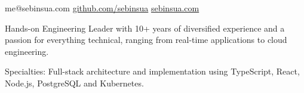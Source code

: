 \documentclass[10pt,a4paper]{article}
\begin{document}
\sloppy  %


\nobreakvspace{0.3em}  %

\noindent
me@sebinsua.com\sbull
\href{http://github.com/sebinsua}{github.com/sebinsua}\sbull
\href{http://sebinsua.com}{sebinsua.com}

\spacedhrule{0.9em}{-0.4em}  %


\vspace{-0em}  %

\noindent Hands-on Engineering Leader with 10+ years of diversified experience and a passion for everything technical, ranging from real-time applications to cloud engineering.

\inlineheadsection  %
  {Specialties:}
  {Full-stack architecture and implementation using TypeScript, React, Node.js, PostgreSQL and Kubernetes.}

\spacedhrule{1.5em}{-0.4em}

\end{document}
